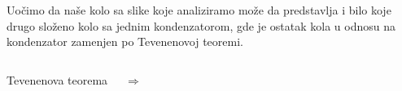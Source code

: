 \begin{frame}[label=08-s046]
Uočimo da naše kolo sa slike koje analiziramo može da predstavlja i bilo koje drugo složeno kolo sa jednim kondenzatorom, gde je ostatak kola u odnosu na kondenzator zamenjen po Tevenenovoj teoremi.\par\bigskip
\begin{columns}[c,onlytextwidth]\centering
{}\centering\gusttekst Tevenenova teorema\par{\LARGE$\Longrightarrow$}
\centering\end{columns}
\end{frame}
